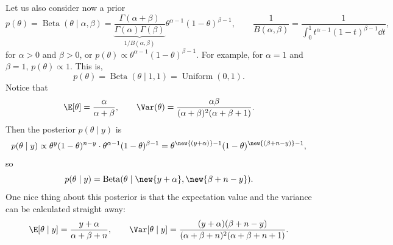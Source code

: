 Let us also consider now a prior
\[
p(\theta) = \operatorname{Beta}(\theta \mid \alpha, \beta) = \underbrace{\frac{\Gamma(\alpha+\beta)}{\Gamma(\alpha)\Gamma(\beta)}}_{1/B(\alpha,\beta)}\theta^{\alpha-1}(1-\theta)^{\beta-1},
\qquad
\frac{1}{B(\alpha,\beta)} = \frac{1}{\int_0^1 t^{\alpha-1}(1-t)^{\beta-1}\dd t},
\]
for $\alpha > 0$ and $\beta > 0$, or $p(\theta) \propto \theta^{\alpha-1}(1-\theta)^{\beta-1}$. For example, for $\alpha = 1$ and $\beta = 1$, $p(\theta) \propto 1$. This is,
\[
p(\theta) = \operatorname{Beta}(\theta \mid 1, 1) = \operatorname{Uniform}(0,1).
\]
Notice that
\[
\E[\theta] = \frac{\alpha}{\alpha + \beta}, \qquad \Var(\theta) = \frac{\alpha\beta}{(\alpha+\beta)^2(\alpha+\beta+1)}.
\]
Then the posterior $p(\theta \mid y)$ is
\[
p(\theta \mid y) \propto \theta^{y}(1-\theta)^{n-y}\cdot\theta^{\alpha-1}(1-\theta)^{\beta-1}
= \theta^{\new{(y+\alpha)}-1}(1-\theta)^{\new{(\beta+n-y)}-1},
\]
so
\[
p(\theta \mid y) = \operatorname{Beta}(\theta \mid \new{y + \alpha}, \new{\beta + n - y}).
\]
One nice thing about this posterior is that the expectation value and the variance can be calculated straight away:
\[
\E[\theta \mid y] = \frac{y + \alpha}{\alpha + \beta + n},
\qquad
\Var[\theta \mid y] = \frac{(y+\alpha)(\beta + n - y)}{(\alpha+\beta+n)^2(\alpha+\beta+n+1)}.
\]

